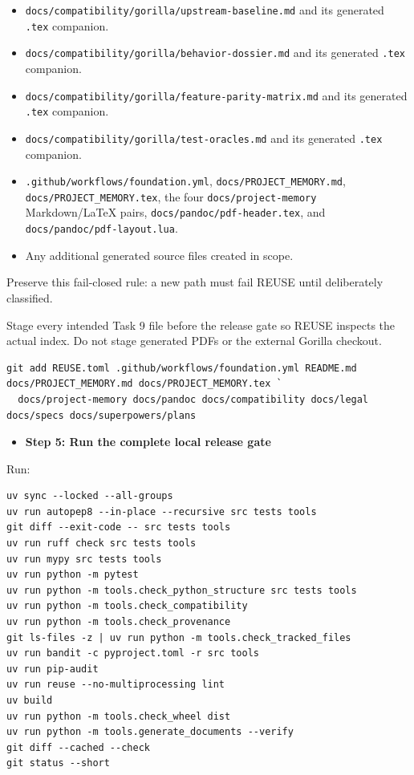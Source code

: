 \documentclass[
  letterpaper,
]{article}
\newcommand{\passthrough}[1]{#1}
\providecommand{\tightlist}{%
  \setlength{\itemsep}{0pt}\setlength{\parskip}{0pt}}
\begin{document}
\begin{itemize}
\tightlist
\item
  \nolinkurl{docs/compatibility/gorilla/upstream-baseline.md} and its generated \passthrough{\lstinline!.tex!}
  companion.
\item
  \nolinkurl{docs/compatibility/gorilla/behavior-dossier.md} and its generated \passthrough{\lstinline!.tex!} companion.
\item
  \nolinkurl{docs/compatibility/gorilla/feature-parity-matrix.md} and its generated \passthrough{\lstinline!.tex!}
  companion.
\item
  \nolinkurl{docs/compatibility/gorilla/test-oracles.md} and its generated \passthrough{\lstinline!.tex!} companion.
\item
  \nolinkurl{.github/workflows/foundation.yml}, \nolinkurl{docs/PROJECT_MEMORY.md}, \nolinkurl{docs/PROJECT_MEMORY.tex},
  the four \nolinkurl{docs/project-memory} Markdown/LaTeX pairs, \nolinkurl{docs/pandoc/pdf-header.tex}, and
  \nolinkurl{docs/pandoc/pdf-layout.lua}.
\item
  Any additional generated source files created in scope.
\end{itemize}

Preserve this fail-closed rule: a new path must fail REUSE until deliberately classified.

Stage every intended Task 9 file before the release gate so REUSE inspects the actual index. Do not stage generated PDFs
or the external Gorilla checkout.

\begin{lstlisting}
git add REUSE.toml .github/workflows/foundation.yml README.md docs/PROJECT_MEMORY.md docs/PROJECT_MEMORY.tex `
  docs/project-memory docs/pandoc docs/compatibility docs/legal docs/specs docs/superpowers/plans
\end{lstlisting}

\begin{itemize}
\tightlist
\item[$\boxtimes$]
  \textbf{Step 5: Run the complete local release gate}
\end{itemize}

Run:

\begin{lstlisting}
uv sync --locked --all-groups
uv run autopep8 --in-place --recursive src tests tools
git diff --exit-code -- src tests tools
uv run ruff check src tests tools
uv run mypy src tests tools
uv run python -m pytest
uv run python -m tools.check_python_structure src tests tools
uv run python -m tools.check_compatibility
uv run python -m tools.check_provenance
git ls-files -z | uv run python -m tools.check_tracked_files
uv run bandit -c pyproject.toml -r src tools
uv run pip-audit
uv run reuse --no-multiprocessing lint
uv build
uv run python -m tools.check_wheel dist
uv run python -m tools.generate_documents --verify
git diff --cached --check
git status --short
\end{lstlisting}
\end{document}
